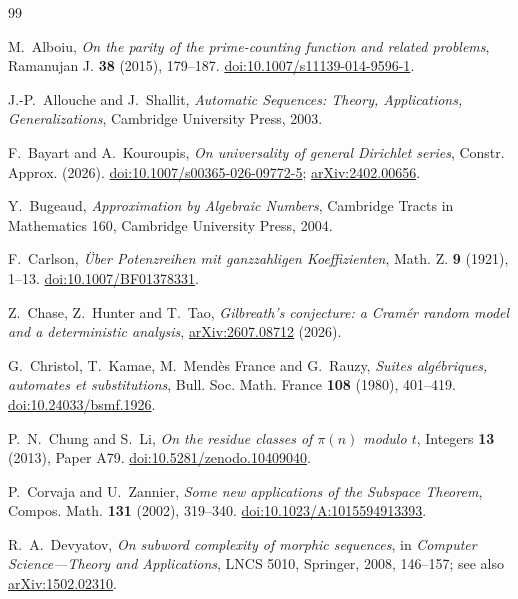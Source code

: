 \documentclass[11pt]{article}
\theoremstyle{definition}
\theoremstyle{remark}
\begin{document}
\begin{thebibliography}{99}

M.~Alboiu,
\emph{On the parity of the prime-counting function and related problems},
Ramanujan J. \textbf{38} (2015), 179--187.
\href{https://doi.org/10.1007/s11139-014-9596-1}{doi:10.1007/s11139-014-9596-1}.

J.-P.~Allouche and J.~Shallit,
\emph{Automatic Sequences: Theory, Applications, Generalizations},
Cambridge University Press, 2003.

F.~Bayart and A.~Kouroupis,
\emph{On universality of general Dirichlet series},
Constr. Approx. (2026).
\href{https://doi.org/10.1007/s00365-026-09772-5}{doi:10.1007/s00365-026-09772-5};
\href{https://arxiv.org/abs/2402.00656}{arXiv:2402.00656}.

Y.~Bugeaud,
\emph{Approximation by Algebraic Numbers},
Cambridge Tracts in Mathematics 160, Cambridge University Press, 2004.

F.~Carlson,
\emph{\"Uber Potenzreihen mit ganzzahligen Koeffizienten},
Math. Z. \textbf{9} (1921), 1--13.
\href{https://doi.org/10.1007/BF01378331}{doi:10.1007/BF01378331}.

Z.~Chase, Z.~Hunter and T.~Tao,
\emph{Gilbreath's conjecture: a Cram\'er random model and a deterministic analysis},
\href{https://arxiv.org/abs/2607.08712}{arXiv:2607.08712} (2026).

G.~Christol, T.~Kamae, M.~Mend\`es France and G.~Rauzy,
\emph{Suites alg\'ebriques, automates et substitutions},
Bull. Soc. Math. France \textbf{108} (1980), 401--419.
\href{https://doi.org/10.24033/bsmf.1926}{doi:10.24033/bsmf.1926}.

P.~N.~Chung and S.~Li,
\emph{On the residue classes of $\pi(n)$ modulo $t$},
Integers \textbf{13} (2013), Paper A79.
\href{https://doi.org/10.5281/zenodo.10409040}{doi:10.5281/zenodo.10409040}.

P.~Corvaja and U.~Zannier,
\emph{Some new applications of the Subspace Theorem},
Compos. Math. \textbf{131} (2002), 319--340.
\href{https://doi.org/10.1023/A:1015594913393}{doi:10.1023/A:1015594913393}.

R.~A.~Devyatov,
\emph{On subword complexity of morphic sequences},
in \emph{Computer Science---Theory and Applications}, LNCS 5010,
Springer, 2008, 146--157; see also
\href{https://arxiv.org/abs/1502.02310}{arXiv:1502.02310}.


\end{thebibliography}
\end{document}
